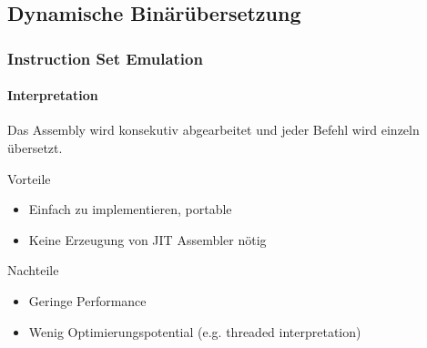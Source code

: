 \subsection{Dynamische Binärübersetzung} %
\begin{frame}
    \frametitle{Instruction Set Emulation}
    \framesubtitle{Interpretation}

    Das Assembly wird konsekutiv abgearbeitet und jeder Befehl wird einzeln übersetzt.

    \vspace{0.50cm}

    \begin{exampleblock}{Vorteile}
        \begin{itemize}
            \item[$\textcolor{TUMGreen}\blacksquare$] Einfach zu implementieren, portable
            \item[$\textcolor{TUMGreen}\blacksquare$] Keine Erzeugung von JIT Assembler nötig
        \end{itemize}
    \end{exampleblock}

    \vspace{0.50cm}

    \begin{alertblock}{Nachteile}
        \begin{itemize}
            \item[$\textcolor{TUMOrange}\blacksquare$] Geringe Performance
            \item[$\textcolor{TUMOrange}\blacksquare$] Wenig Optimierungspotential (e.g. threaded interpretation)
        \end{itemize}
    \end{alertblock}
\end{frame}

